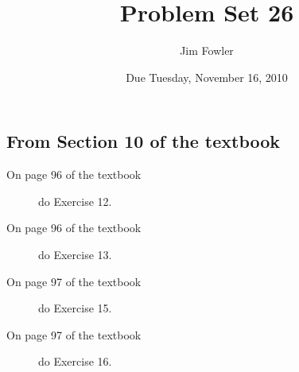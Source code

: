 \documentclass[12pt]{handout}
\author{Jim Fowler}
\title{Problem Set 26}
\date{Due Tuesday, November 16, 2010}
\begin{document}
\maketitle










\subsection*{From Section 10 of the textbook}



\begin{description}

\item[On page 96 of the textbook] do Exercise 12.

\item[On page 96 of the textbook] do Exercise 13.

\item[On page 97 of the textbook] do Exercise 15.

\item[On page 97 of the textbook] do Exercise 16.

\end{description}
\end{document}
